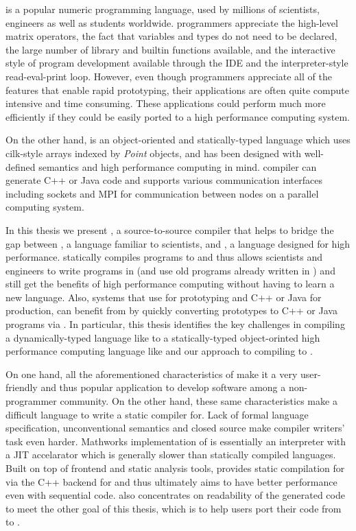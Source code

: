 \matlab is a popular numeric programming language, used by millions of
scientists, engineers as well as students worldwide\cite{MatlabGrowth}.  \matlab
programmers appreciate the high-level matrix operators,  the fact that
variables and types do not need to be declared, the large number of library and
builtin functions available, and the interactive style of program development
available through the IDE and the interpreter-style read-eval-print loop.
However, even though \matlab programmers appreciate all of the features that
enable rapid prototyping,  their applications are often quite compute intensive
and time consuming. These applications could perform much more efficiently if
they could be easily ported to a high performance computing system.  

On the other hand, \xten is an object-oriented and statically-typed language
which uses cilk-style arrays indexed by \emph{Point} objects, and has been
designed with well-defined semantics and high performance computing in mind.
\xten compiler can generate C++ or Java code and supports various communication
interfaces including sockets and MPI for communication between nodes on a
parallel computing system.

In this thesis we present \mixten, a source-to-source compiler that helps
to bridge the gap between \matlab, a language familiar to scientists,
and \xten,  a language designed for high performance. \mixten statically
compiles \matlab programs to \xten and thus
allows scientists and engineers to write programs in \matlab (and use old 
programs already written in \matlab) and still get the benefits of high 
performance computing without having to learn a new language. Also, systems that
use \matlab for prototyping and C++ or Java for production, can benefit from
\mixten by quickly converting \matlab prototypes to C++ or Java programs via 
\xten. In particular, this thesis identifies the key challenges in compiling a
dynamically-typed language like \matlab to a statically-typed object-orinted
high performance computing language like \xten and our approach to 
compiling \matlab to \xten.
\begin{comment}
INSERT PIC
compilation flow
\end{comment}

On one hand, all the aforementioned characteristics of \matlab make it a very 
user-friendly and thus popular application to develop software among a
non-programmer community. On the other hand, these same characteristics make
\matlab a difficult language to write a static compiler for. Lack of formal 
language specification, unconventional semantics and closed source make compiler
writers' task even harder. Mathworks implementation of \matlab is essentially an
interpreter with a JIT accelarator which is generally slower than statically
compiled languages. Built on top of \mclab frontend and static analysis tools,
 \mixten provides static compilation for \matlab via the C++
backend for \xten and thus ultimately aims to have better performance even with
sequential code. \mixten also concentrates on readability of the generated \xten
code to meet the other goal of this thesis, which is to help users port 
their code from \matlab to \xten.    

